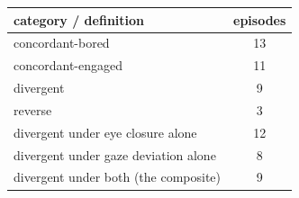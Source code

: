 \begin{tabular}{lc}
\hline
category / definition & episodes \\
\hline
concordant-bored & 13 \\
concordant-engaged & 11 \\
divergent & 9 \\
reverse & 3 \\
divergent under eye closure alone & 12 \\
divergent under gaze deviation alone & 8 \\
divergent under both (the composite) & 9 \\
\hline
\end{tabular}
